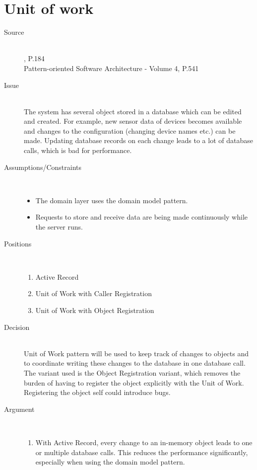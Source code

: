 \section{Unit of work}

\begin{description}
\item [Source]~\\
\EAA , P.184 \cite{eaa}\\
Pattern-oriented Software Architecture - Volume 4, P.541 \cite{wiley-4}

\item [Issue]~\\
The system has several object stored in a database which can be edited and created. For example, new sensor data of devices becomes available and changes to the configuration (changing device names etc.) can be made. Updating database records on each change leads to a lot of database calls, which is bad for performance.

\item [Assumptions/Constraints]~\\
\begin{itemize}
\item The domain layer uses the domain model pattern.
\item Requests to store and receive data are    being made continuously while the server runs.

\end{itemize}

\item [Positions]~
\begin{enumerate}
\item Active Record
\item Unit of Work with Caller Registration
\item Unit of Work with Object Registration
\end{enumerate}

\item [Decision] ~\\
Unit of Work pattern will be used to keep track of changes to objects and to coordinate writing these changes to the database in one database call.
The variant used is the Object Registration variant, which removes the burden of having to register the object explicitly with the Unit of Work. Registering the object self could introduce bugs.

\item [Argument]~\\
\begin{enumerate}
\item With Active Record, every change to an in-memory object leads to one or multiple database calls. This reduces the performance significantly, especially when using the domain model pattern.


\end{enumerate}
\end{description}
